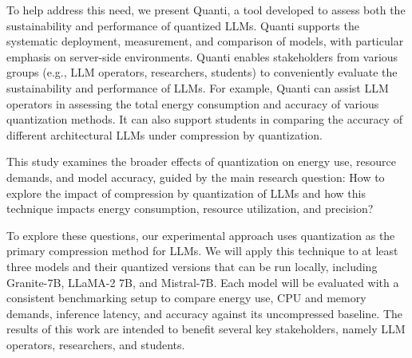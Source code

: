 To help address this need, we present Quanti, a tool developed to assess both the sustainability and performance of quantized LLMs. Quanti supports the systematic deployment, measurement, and comparison of models, with particular emphasis on server-side environments. Quanti enables stakeholders from various groups (e.g., LLM operators, researchers, students) to conveniently evaluate the sustainability and performance of LLMs. For example, Quanti can assist LLM operators in assessing the total energy consumption and accuracy of various quantization methods. It can also support students in comparing the accuracy of different architectural LLMs under compression by quantization.

This study examines the broader effects of quantization on energy use, resource demands, and model accuracy, guided by the main research question: How to explore the impact of compression by quantization of LLMs and how this technique impacts energy consumption, resource utilization, and precision?






To explore these questions, our experimental approach uses quantization as the primary compression method for LLMs. We will apply this technique to at least three models and their quantized versions that can be run locally, including Granite-7B, LLaMA-2 7B, and Mistral-7B. Each model will be evaluated with a consistent benchmarking setup to compare energy use, CPU and memory demands, inference latency, and accuracy against its uncompressed baseline. The results of this work are intended to benefit several key stakeholders, namely LLM operators, researchers, and students. 


